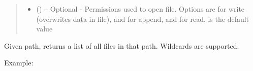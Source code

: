 \documentclass[a4paper,10pt,openany,english]{sphinxmanual}
\begin{document}
\begin{fulllineitems}
\begin{fulllineitems}
\begin{quote}
\begin{description}
\begin{itemize}
\item {} 
 () -- Optional -
Permissions used to open file. Options are  for write (overwrites data in file),
 and  for append, and  for read.  is the default value

\end{itemize}

\end{description}\end{quote}

\end{fulllineitems}


\end{fulllineitems}


\begin{fulllineitems}
\label{egadsapi:egads.input.input_core.get_file_list}
Given path, returns a list of all files in that path. Wildcards are supported.

Example:

\begin{sphinxVerbatim}[commandchars=\\\{\}]
  
\end{sphinxVerbatim}

\end{fulllineitems}

\label{egadsapi:module-egads.input.nasa_ames_io}
\end{document}
